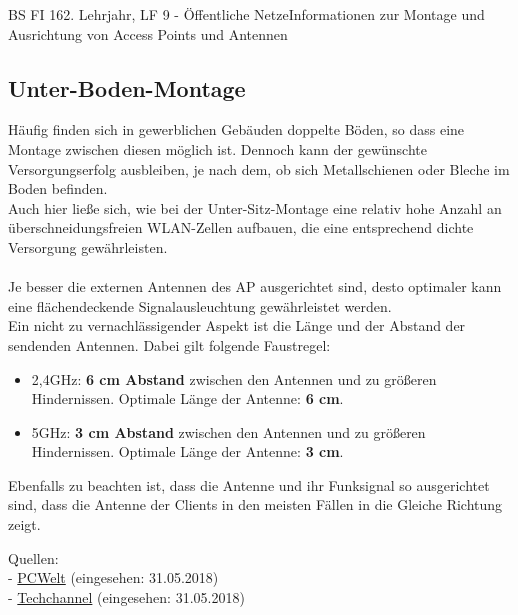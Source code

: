 \documentclass[11pt,twocolumn,oneside,openany,headings=optiontotoc,11pt,numbers=noenddot]{article}
\begin{document}
\begin{worksheet}{BS FI 16}{2. Lehrjahr, LF 9 - Öffentliche Netze}{Informationen zur Montage und Ausrichtung von Access Points und Antennen}
		\subsection*{Unter-Boden-Montage} Häufig finden sich in gewerblichen Gebäuden doppelte Böden, so dass eine Montage zwischen diesen möglich ist. Dennoch kann der gewünschte Versorgungserfolg ausbleiben, je nach dem, ob sich Metallschienen oder Bleche im Boden befinden.\\
		Auch hier ließe sich, wie bei der Unter-Sitz-Montage eine relativ hohe Anzahl an überschneidungsfreien WLAN-Zellen aufbauen, die eine entsprechend dichte Versorgung gewährleisten.\\
		\\
		Je besser die externen Antennen des AP ausgerichtet sind, desto optimaler kann eine flächendeckende Signalausleuchtung gewährleistet werden.\\
		Ein nicht zu vernachlässigender Aspekt ist die Länge und der Abstand der sendenden Antennen. Dabei gilt folgende Faustregel:
		\begin{itemize}
			\item 2,4GHz: \textbf{6 cm Abstand} zwischen den Antennen und zu größeren Hindernissen. Optimale Länge der Antenne: \textbf{6 cm}.
			\item 5GHz: \textbf{3 cm Abstand} zwischen den Antennen und zu größeren Hindernissen. Optimale Länge der Antenne: \textbf{3 cm}.
		\end{itemize}
		Ebenfalls zu beachten ist, dass die Antenne und ihr Funksignal so ausgerichtet sind, dass die Antenne der Clients in den meisten Fällen in die Gleiche Richtung zeigt.
		\par\bigskip\noindent
		\tiny{Quellen:\\
			- \href{https://www.pcwelt.de/tipps/Auf-Abstand-und-Ausrichtung-der-Antennen-achten-9705621.html}{PCWelt} (eingesehen: 31.05.2018)\\
			- \href{https://www.tecchannel.de/a/access-points-richtig-montieren,2059035}{Techchannel} (eingesehen: 31.05.2018)}
	\end{worksheet}
\end{document}
